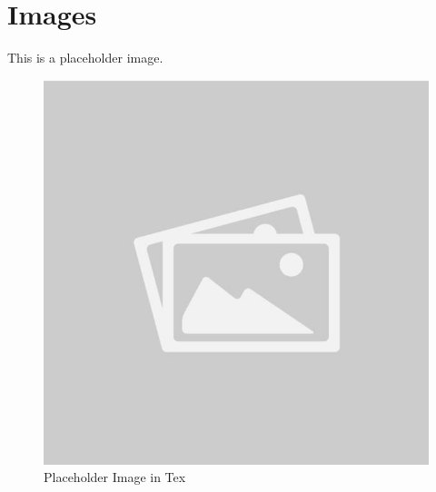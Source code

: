 \section{Images}
\lipsum[50]
This is a placeholder image.
\begin{figure}[H]
	\includegraphics[width=\textwidth]{./images/placeholder_image}
	\caption{Placeholder Image in Tex}
\end{figure}